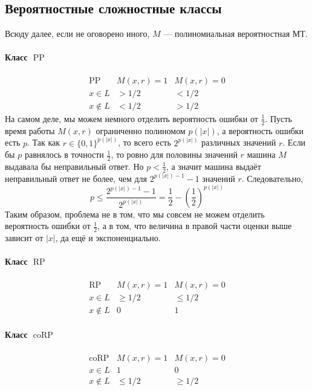 \documentclass[11pt]{article}
\DeclareMathOperator{\PP}{PP}
\DeclareMathOperator{\RP}{RP}
\DeclareMathOperator{\coRP}{coRP}
\begin{document}
\subsection{Вероятностные сложностные классы}

Всюду далее, если не оговорено иного, $M$ --- полиномиальная вероятностная МТ.
\paragraph{Класс $\PP$}
\[
\renewcommand{\arraystretch}{1.5}
\begin{array}{c|c|c}
\PP & M(x,r)=1 & M(x,r)=0 \\ \hline
x \in L    & > 1/2    & < 1/2    \\ \hline
x \notin L & < 1/2    & > 1/2
\end{array}
\]
На самом деле, мы можем немного отделить вероятность ошибки от $\frac{1}{2}$. Пусть время работы $M(x, r)$ ограниченно полиномом $p(\left\lvert x \right\rvert)$, а вероятность ошибки есть $p$. 
Так как $r \in \{0, 1\}^{p(\left\lvert x \right\rvert)}$, то всего есть $2^{p(\left\lvert x \right\rvert)}$ различных значений $r$. Если бы $p$ равнялось в точности $\frac{1}{2}$, то ровно для половины значений $r$ машина $M$ выдавала бы неправильный ответ. Но $p < \frac{1}{2}$, а значит машина выдаёт неправильный ответ не более, чем для $2^{p(\left\lvert x \right\rvert) - 1} - 1$ значений $r$. Следовательно,
\[p \leq \frac{2^{p(\left\lvert x \right\rvert) - 1} - 1}{2^{p(\left\lvert x \right\rvert)}} = \frac{1}{2} - \left(\frac{1}{2}\right)^{p(\left\lvert x \right\rvert)}\]
Таким образом, проблема не в том, что мы совсем не можем отделить вероятность ошибки от $\frac{1}{2}$, а в том, что величина в правой части оценки выше зависит от $\left\lvert x \right\rvert$, да ещё и экспоненциально.
\paragraph{Класс $\RP$}
\[
\renewcommand{\arraystretch}{1.5}
\begin{array}{c|c|c}
\RP & M(x,r)=1 & M(x,r)=0 \\ \hline
x \in L    & \geq 1/2    & \leq 1/2    \\ \hline
x \notin L &  0    &  1
\end{array}
\]
\paragraph{Класс $\coRP$}
\[
\renewcommand{\arraystretch}{1.5}
\begin{array}{c|c|c}
\coRP & M(x,r)=1 & M(x,r)=0 \\ \hline
x \in L    & 1    & 0    \\ \hline
x \notin L &  \leq 1/2    &  \geq 1/2
\end{array}
\]
\end{document}
